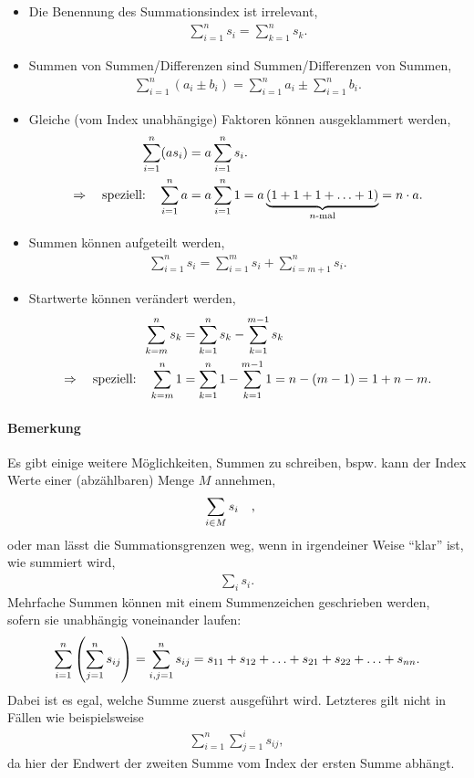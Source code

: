 \begin{itemize}
    \item Die Benennung des Summationsindex ist irrelevant, 
    \begin{align}
        \sum_{i=1}^n s_i = \sum_{k=1}^n s_k.
    \end{align}
    \item Summen von Summen/Differenzen sind Summen/Differenzen von Summen, 
    \begin{align}
        \sum_{i=1}^n (a_i \pm b_i) = \sum_{i=1}^n a_i \pm \sum_{i=1}^n b_i.
    \end{align}
    \item Gleiche (vom Index unabhängige) Faktoren können ausgeklammert werden, 
    \begin{align}
        \sum_{i=1}^n (a s_i) &= a \sum_{i=1}^n s_i. \notag \\
        \Rightarrow \qq{speziell:} \sum_{i=1}^n a &= a \sum_{i=1}^n 1 = a\underbrace{(1+1+1+\hdots+1)}_{n\text{-mal}} = n \cdot a. \notag 
    \end{align}
    \item Summen können aufgeteilt werden,
    \begin{align}
        \sum_{i=1}^n s_i = \sum_{i=1}^m s_i + \sum_{i=m+1}^n s_i.
    \end{align}
    \item Startwerte können verändert werden, 
    \begin{align}
        \sum_{k=m}^n s_k &= \sum_{k=1}^n s_k - \sum_{k=1}^{m-1} s_k \\ 
        \Rightarrow \qq{speziell:} \sum_{k=m}^n 1 &= \sum_{k=1}^n 1 - \sum_{k=1}^{m-1} 1 = n -(m-1) = 1 + n -m. \notag 
    \end{align}
\end{itemize}

\paragraph{Bemerkung} Es gibt einige weitere Möglichkeiten, Summen zu schreiben, bspw. kann der Index Werte einer (abzählbaren) Menge $M$ annehmen, 
\begin{align}
    \sum_{i \in M} s_i \qq{,}
\end{align}
oder man lässt die Summationsgrenzen weg, wenn in irgendeiner Weise ``klar'' ist, wie summiert wird, 
\begin{align}
    \sum_i s_i. 
\end{align}
Mehrfache Summen können mit einem Summenzeichen geschrieben werden, sofern sie unabhängig voneinander laufen:
\begin{align}
    \sum_{i=1}^n \qty(\sum_{j=1}^n s_{ij}) = \sum_{i,j=1}^n s_{ij} = s_{11} + s_{12} + \hdots + s_{21} + s_{22} + \hdots + s_{nn}.
\end{align}
Dabei ist es egal, welche Summe zuerst ausgeführt wird. Letzteres gilt nicht in Fällen wie beispielsweise 
\begin{align}
    \sum_{i=1}^n \sum_{j=1}^i s_{ij},
\end{align}
da hier der Endwert der zweiten Summe vom Index der ersten Summe abhängt.

